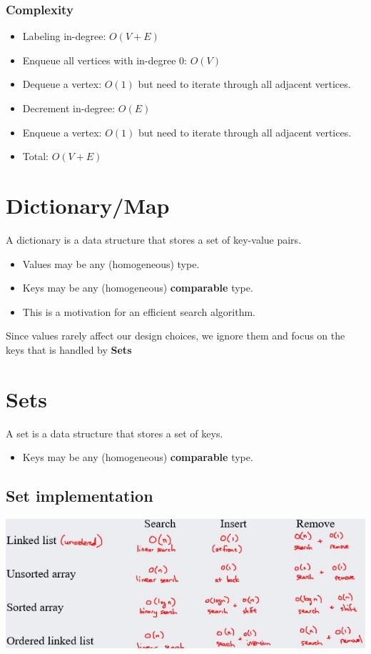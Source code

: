 \documentclass[letterpaper,12pt]{article}
\begin{document}
\subsubsection{Complexity}
\begin{itemize}
    \item Labeling in-degree: $O(V+E)$
    \item Enqueue all vertices with in-degree 0: $O(V)$
    \item Dequeue a vertex: $O(1)$ but need to iterate through all adjacent vertices.
    \item Decrement in-degree: $O(E)$
    \item Enqueue a vertex: $O(1)$ but need to iterate through all adjacent vertices.
    \item Total: $O(V+E)$
\end{itemize}

\section{Dictionary/Map}
A dictionary is a data structure that stores a set of key-value pairs. \begin{itemize}
    \item Values may be any (homogeneous) type.
    \item Keys may be any (homogeneous) \textbf{comparable} type.
    \item This is a motivation for an efficient search algorithm.
\end{itemize}
Since values rarely affect our design choices, we ignore them and focus on the keys that is handled by \textbf{Sets}
\section{Sets}
A set is a data structure that stores a set of keys. \begin{itemize}
    \item Keys may be any (homogeneous) \textbf{comparable} type.
\end{itemize}
\subsection{Set implementation}
\includegraphics*[scale = 0.8]{./Images/Set implementations.jpg}
\end{document}
